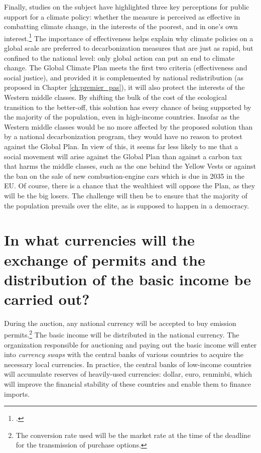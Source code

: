 \documentclass[a5paper,english,openany]{memoir}
\begin{document}
Finally, studies on the subject have highlighted three key perceptions for public support for a climate policy: whether the measure is perceived as %
effective in combatting climate change, in the interests of the poorest, and in one's own interest.\footnote{\citet{dechezlepretre_fighting_2022}.} The importance of effectiveness helps explain why climate policies on a global scale are preferred to decarbonization %
measures that are just as rapid, but confined to the national level: only global action can put an end to climate change. The Global Climate Plan meets the first two criteria (effectiveness and social justice), and provided it is complemented by national redistribution (as proposed in Chapter \ref{ch:premier_pas}), it will also protect the interests of the Western middle classes. By shifting the bulk of the cost of the ecological transition %
to the better-off, %
this solution has every chance of being supported by the majority of the population, even in high-income countries. Insofar as the Western middle classes would be no more affected by the proposed solution than by a national decarbonization %
program, they would have no reason to protest against the Global Plan. In view of this, it seems far less likely to me that a social movement will arise against the Global Plan than against a carbon tax that harms the middle classes, such as the one behind the Yellow Vests %
or against the ban on the sale of new combustion-engine cars which is due in 2035 in the EU. %
Of course, there is a chance that the wealthiest will oppose the Plan, as they will be the big losers. The challenge will then be to ensure that the majority of the population prevails over the elite, as is supposed to happen in a democracy.


\section*{\normalsize In what currencies will the exchange of permits and the distribution of the basic income be carried out?\label{q:devise}}

During the auction, any national currency will be accepted to buy emission permits.\footnote{The conversion rate used will be the market rate at the time of the deadline for the transmission of purchase options.} The basic income will be distributed in the national currency. The organization %
responsible for auctioning and paying out the basic income will enter into \textit{currency swaps} with the central banks of various countries to acquire the necessary local currencies. In practice, the central banks of low-income countries will accumulate reserves of heavily-used currencies: dollar, euro, renminbi, %
which will improve the financial stability of these countries and enable them to finance imports.
\end{document}

